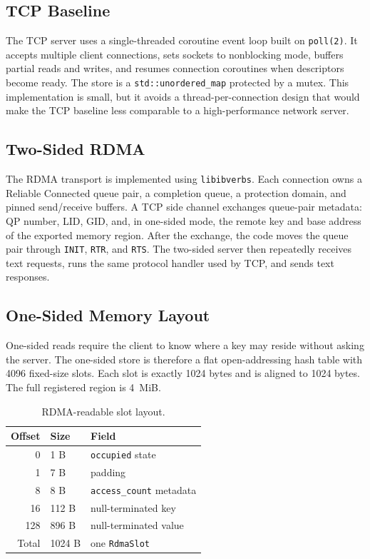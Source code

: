 \documentclass[letterpaper,twocolumn,10pt]{article}
\begin{document}
\subsection{TCP Baseline}

The TCP server uses a single-threaded coroutine event loop built on
\texttt{poll(2)}.  It accepts multiple client connections, sets sockets to
nonblocking mode, buffers partial reads and writes, and resumes connection
coroutines when descriptors become ready.  The store is a
\texttt{std::unordered\_map} protected by a mutex.  This implementation is
small, but it avoids a thread-per-connection design that would make the TCP
baseline less comparable to a high-performance network server.

\subsection{Two-Sided RDMA}

The RDMA transport is implemented using \texttt{libibverbs}.  Each connection
owns a Reliable Connected queue pair, a completion queue, a protection domain,
and pinned send/receive buffers.  A TCP side channel exchanges queue-pair
metadata: QP number, LID, GID, and, in one-sided mode, the remote key and base
address of the exported memory region.  After the exchange, the code moves the
queue pair through \texttt{INIT}, \texttt{RTR}, and \texttt{RTS}.  The
two-sided server then repeatedly receives text requests, runs the same protocol
handler used by TCP, and sends text responses.

\subsection{One-Sided Memory Layout}

One-sided reads require the client to know where a key may reside without
asking the server.  The one-sided store is therefore a flat open-addressing
hash table with 4096 fixed-size slots.  Each slot is exactly 1024 bytes and is
aligned to 1024 bytes.  The full registered region is 4~MiB.

\begin{table}[H]
\centering
\caption{RDMA-readable slot layout.}
\label{tab:slot-layout}
\begin{tabular}{rll}
\toprule
Offset & Size & Field \\
\midrule
0   & 1 B   & \texttt{occupied} state \\
1   & 7 B   & padding \\
8   & 8 B   & \texttt{access\_count} metadata \\
16  & 112 B & null-terminated key \\
128 & 896 B & null-terminated value \\
\midrule
Total & 1024 B & one \texttt{RdmaSlot} \\
\bottomrule
\end{tabular}
\end{table}
\end{document}
